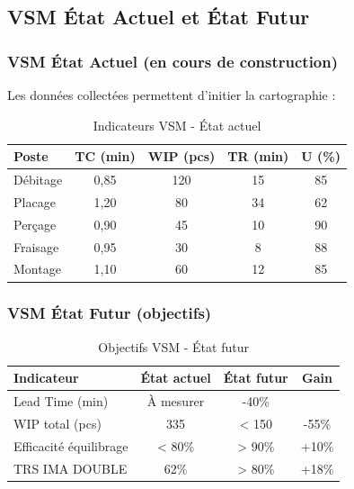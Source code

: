 \documentclass[12pt,a4paper]{article}
\begin{document}
\begin{center}
\subsection{VSM État Actuel et État Futur}

\subsubsection{VSM État Actuel (en cours de construction)}

Les données collectées permettent d'initier la cartographie :

\begin{table}[H]
\centering
\caption{Indicateurs VSM - État actuel}
\label{tab:ynion_vsm_actuel}
\begin{tabular}{|l|c|c|c|c|}
\hline
\textbf{Poste} & \textbf{TC (min)} & \textbf{WIP (pcs)} & \textbf{TR (min)} & \textbf{U (\%)} \\ \hline
Débitage & 0,85 & 120 & 15 & 85 \\ \hline
Placage & 1,20 & 80 & 34 & 62 \\ \hline
Perçage & 0,90 & 45 & 10 & 90 \\ \hline
Fraisage & 0,95 & 30 & 8 & 88 \\ \hline
Montage & 1,10 & 60 & 12 & 85 \\ \hline
\end{tabular}
\end{table}

\subsubsection{VSM État Futur (objectifs)}

\begin{table}[H]
\centering
\caption{Objectifs VSM - État futur}
\label{tab:ynion_vsm_futur}
\begin{tabular}{|l|c|c|c|}
\hline
\textbf{Indicateur} & \textbf{État actuel} & \textbf{État futur} & \textbf{Gain} \\ \hline
Lead Time (min) & À mesurer & -40\% & \\ \hline
WIP total (pcs) & 335 & < 150 & -55\% \\ \hline
Efficacité équilibrage & < 80\% & > 90\% & +10\% \\ \hline
TRS IMA DOUBLE & 62\% & > 80\% & +18\% \\ \hline
\end{tabular}
\end{table}


\end{center}
\end{document}
